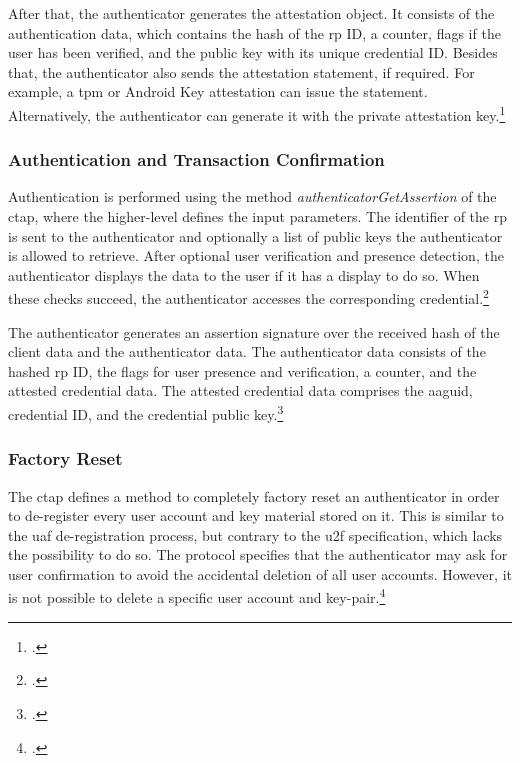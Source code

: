 After that, the authenticator generates the attestation object. It consists of the authentication data, which contains the hash of the \gls{rp} ID, a counter, flags if the user has been verified, and the public key with its unique credential ID. Besides that, the authenticator also sends the attestation statement, if required. For example, a \gls{tpm} or Android Key attestation can issue the statement. Alternatively, the authenticator can generate it with the private attestation key.\footcites[See][9]{ctap2}[See][Chapter 8]{w3c}

\subsubsection{Authentication and Transaction Confirmation}

Authentication is performed using the method \textit{authenticatorGetAssertion} of the \gls{ctap}, where the higher-level \wa{} defines the input parameters. The identifier of the \gls{rp} is sent to the authenticator and optionally a list of public keys the authenticator is allowed to retrieve. After optional user verification and presence detection, the authenticator displays the data to the user if it has a display to do so. When these checks succeed, the authenticator accesses the corresponding credential.\footcites[See][11-13]{ctap2}

The authenticator generates an assertion signature over the received hash of the client data and the authenticator data. The authenticator data consists of the hashed \gls{rp} ID, the flags for user presence and verification, a counter, and the attested credential data. The attested credential data comprises the \gls{aaguid}, credential ID, and the credential public key.\footcites[See][Chapter 6.4.1.]{w3c}

\subsubsection{Factory Reset}

The \gls{ctap} defines a method to completely factory reset an authenticator in order to de-register every user account and key material stored on it. This is similar to the \gls{uaf} de-registration process, but contrary to the \gls{u2f} specification, which lacks the possibility to do so. The protocol specifies that the authenticator may ask for user confirmation to avoid the accidental deletion of all user accounts. However, it is not possible to delete a specific user account and key-pair.\footcites[See][26]{ctap2}

